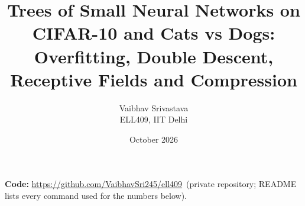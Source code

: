 \documentclass[10pt]{article}
\title{Trees of Small Neural Networks on CIFAR-10 and Cats vs Dogs:\\ Overfitting, Double Descent, Receptive Fields and Compression}
\author{Vaibhav Srivastava\\ ELL409, IIT Delhi}
\date{October 2026}
\newcommand{\repo}{\url{https://github.com/VaibhavSri245/ell409}}
\begin{document}
\maketitle

\noindent\textbf{Code:} \repo\ (private repository; README lists every command used for the numbers below).









\end{document}
